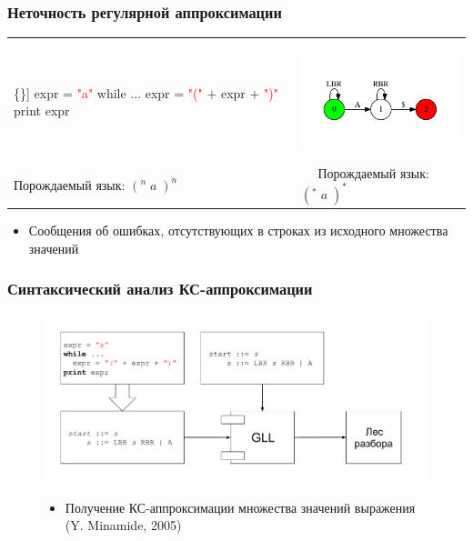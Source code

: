 \documentclass{beamer}
\begin{document}
\begin{frame}[fragile]
	\transwipe[direction=90]
	\frametitle{Неточность регулярной аппроксимации}
	\begin{table}[h]
		\centering
		\begin{tabular}{p{5cm} p{5cm}}
			\begin{center}
				\begin{Verbatim}[commandchars=\\\{\}]
expr = \textcolor{red}{"a"}
while ...
    expr = \textcolor{red}{"("} + expr + \textcolor{red}{")"}
print expr
				\end{Verbatim}
			\end{center}
			&
			\vspace{-15pt}
			\begin{center}
				\includegraphics[width=5cm]{pictures/reg_app.pdf}	
			\end{center} \\
			Порождаемый язык: $(^n \; a \; )^n$
			&
			$\quad$ Порождаемый язык: $(^* \; a \; )^*$
		\end{tabular}
	\end{table}
	\begin{itemize}
		\item Сообщения об ошибках, отсутствующих в строках из исходного множества значений
	\end{itemize}
\end{frame}

\begin{frame}[fragile]
	\transwipe[direction=90]
	\frametitle{Синтаксический анализ КС-аппроксимации}
	\begin{figure}
		\centering
		\includegraphics[width=12cm]{pictures/scheme_cs.pdf}
		\begin{itemize}
			\item Получение КС-аппроксимации множества значений выражения $\,$ (Y. Minamide, 2005)
		\end{itemize}
	\end{figure}
\end{frame}
\end{document}
